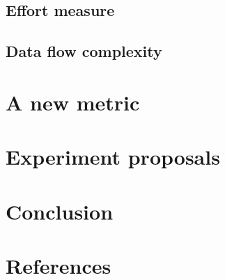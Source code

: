 \documentclass[]{article}
\begin{document}
\cite{ref:cilibrasi2005clustering}

\subsection{Effort measure}

\cite{ref:evaluating_software_complexity_measures}

\subsection{Data flow complexity}

\cite{ref:oviedo1993control}

\section{A new metric}




\section{Experiment proposals}



\section{Conclusion}
\section{References}

\printbibliography
\end{document}
